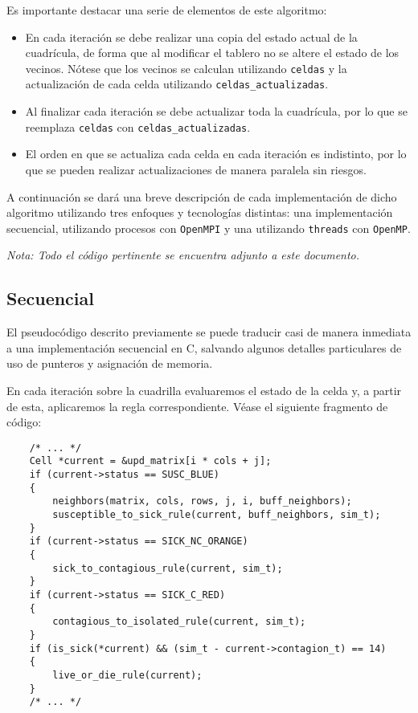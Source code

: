 \documentclass[a4paper,12pt]{article}
\begin{document}
Es importante destacar una serie de elementos de este algoritmo:
\begin{itemize}
    \item En cada iteración se debe realizar una copia del estado actual de la cuadrícula, de forma que al modificar el tablero no se altere el estado de los vecinos. Nótese que los vecinos se calculan utilizando \verb|celdas| y la actualización de cada celda utilizando \verb|celdas_actualizadas|.
    \item Al finalizar cada iteración se debe actualizar toda la cuadrícula, por lo que se reemplaza \verb|celdas| con \verb|celdas_actualizadas|.
    \item El orden en que se actualiza cada celda en cada iteración es indistinto, por lo que se pueden realizar actualizaciones de manera paralela sin riesgos.
\end{itemize}

A continuación se dará una breve descripción de cada implementación de dicho algoritmo utilizando tres enfoques y tecnologías distintas: una implementación secuencial, utilizando procesos con \verb|OpenMPI| y una utilizando \verb|threads| con \verb|OpenMP|.

\emph{Nota: Todo el código pertinente se encuentra adjunto a este documento.}

\subsection{Secuencial}

El pseudocódigo descrito previamente se puede traducir casi de manera inmediata a una implementación secuencial en C, salvando algunos detalles particulares de uso de punteros y asignación de memoria.

En cada iteración sobre la cuadrilla evaluaremos el estado de la celda y, a partir de esta, aplicaremos la regla correspondiente. Véase el siguiente fragmento de código:

\begin{verbatim}
    /* ... */
    Cell *current = &upd_matrix[i * cols + j];
    if (current->status == SUSC_BLUE)
    {
        neighbors(matrix, cols, rows, j, i, buff_neighbors);
        susceptible_to_sick_rule(current, buff_neighbors, sim_t);
    }
    if (current->status == SICK_NC_ORANGE)
    {
        sick_to_contagious_rule(current, sim_t);
    }
    if (current->status == SICK_C_RED)
    {
        contagious_to_isolated_rule(current, sim_t);
    }
    if (is_sick(*current) && (sim_t - current->contagion_t) == 14)
    {
        live_or_die_rule(current);
    }
    /* ... */
\end{verbatim}
\end{document}
